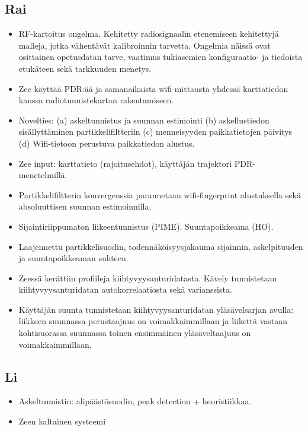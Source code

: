 \documentclass[a4paper]{scrartcl}
\begin{document}
\subsection{Rai\cite{rai2012zee}}
\begin{itemize}
  \item RF-kartoitus ongelma. Kehitetty radiosignaalin etenemiseen kehitettyjä
    malleja, jotka vähentävät kalibroinnin tarvetta. Ongelmia näissä ovat
    osittainen opetusdatan tarve, vaatimus tukiasemien konfiguraatio- ja
    tiedoista etukäteen sekä tarkkuuden menetys.
  \item Zee käyttää PDR:ää ja samanaikaista wifi-mittausta yhdessä karttatiedon
    kanssa radiotunnistekartan rakentamiseen.
  \item Novelties: (a) askeltunnistus ja suunnan estimointi (b) askellustiedon
    sisällyttäminen partikkelifiltteriin (c) menneisyyden paikkatietojen
    päivitys (d) Wifi-tietoon perustuva paikkatiedon alustus.
  \item Zee input: karttatieto (rajoitusehdot), käyttäjän trajektori
    PDR-menetelmillä.
  \item Partikkelifiltterin konvergenssia parannetaan wifi-fingerprint
    alustuksella sekä absoluuttisen suunnan estimoinnilla.
  \item Sijaintiriippumaton liikeentunnistus (PIME). Suuntapoikkeama (HO).
  \item Laajennettu partikkelisuodin, todennäköisyysjakauma sijainnin,
    askelpituuden ja suuntapoikkeaman suhteen.
  \item Zeessä kerättiin profiileja kiihtyvyysanturidatasta. Kävely tunnistetaan
    kiihtyvyysanturidatan autokorrelaatiosta sekä varianssista.
  \item Käyttäjän suunta tunnistetaan kiihtyvyysanturidatan yläsävelsarjan
    avulla: liikkeen suunnassa perustaajuus on voimakkaimmillaan ja
    liikettä vastaan kohtisuorassa suunnassa toinen ensimmäinen
    yläsäveltaajuus on voimakkaimmillaan.
\end{itemize}

\subsection{Li\cite{li2012reliable}}
\begin{itemize}
  \item Askeltunnistin: alipäästösuodin, peak detection + heuristiikkaa.
  \item Zeen kaltainen systeemi
\end{itemize}
\end{document}
